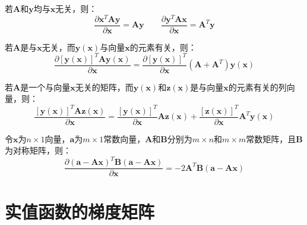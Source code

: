 \documentclass[10pt,a4paper,UTF8]{article}
\begin{document}
\begin{tikzinstance}
若\(\mathbf{A}\)和\(\mathbf{y}\)均与\(\mathbf{x}\)无关，则：
\begin{equation}
\label{eq:21}
\frac{\partial \mathbf{x}^{T}\mathbf{A}\mathbf{y}}{\partial \mathbf{x}} = \mathbf{A}\mathbf{y} \qquad \frac{\partial \mathbf{y}^{T}\mathbf{A}\mathbf{x}}{\partial \mathbf{x}} = \mathbf{A}^{T}\mathbf{y}
\end{equation}
\end{tikzinstance}
\begin{tikzinstance}
若\(\mathbf{A}\)是与\(\mathbf{x}\)无关，而\(\mathbf{y}(\mathbf{x})\)与向量\(\mathbf{x}\)的元素有关，则：
\begin{equation}
\label{eq:22}
\frac{\partial[\mathbf{y}(\mathbf{x})]^{T} \mathbf{A}\mathbf{y}(\mathbf{x})}{\partial \mathbf{x}} = \frac{\partial[\mathbf{y}(\mathbf{x})]^{T}}{\partial \mathbf{x}}(\mathbf{A} + \mathbf{A}^{T})\mathbf{y}(\mathbf{x})
\end{equation}
\end{tikzinstance}
\begin{tikzinstance}
若\(\mathbf{A}\)是一个与向量\(\mathbf{x}\)无关的矩阵，而\(\mathbf{y}(\mathbf{x})\)和\(\mathbf{z}(\mathbf{x})\)是与向量\(\mathbf{x}\)的元素有关的列向量，则：
\begin{equation}
\label{eq:23}
\frac{[\mathbf{y}(\mathbf{x})]^{T} \mathbf{A}\mathbf{z}(\mathbf{x})}{\partial \mathbf{x}} = \frac{[\mathbf{y}(\mathbf{x})]^{T}}{\partial \mathbf{x}} \mathbf{A}\mathbf{z}(\mathbf{x}) + \frac{[\mathbf{z}(\mathbf{x})]^{T}}{\partial \mathbf{x}}\mathbf{A}^{T}\mathbf{y}(\mathbf{x})
\end{equation}
\end{tikzinstance}

\begin{tikzinstance}
令\(\mathbf{x}\)为\(n\times 1\)向量，\(\mathbf{a}\)为\(m\times 1\)常数向量，\(\mathbf{A}\)和\(\mathbf{B}\)分别为\(m\times n\)和\(m\times m\)常数矩阵，且\(\mathbf{B}\)为对称矩阵，则：
\begin{equation}
\label{eq:24}
\frac{\partial (\mathbf{a} - \mathbf{A} \mathbf{x})^{T}\mathbf{B}(\mathbf{a} - \mathbf{A}\mathbf{x})}{\partial \mathbf{x}} = -2\mathbf{A}^{T}\mathbf{B}(\mathbf{a} - \mathbf{A}\mathbf{x})
\end{equation}
\end{tikzinstance}


\section{实值函数的梯度矩阵}
\label{sec:orgfd5e4f4}
\end{document}
